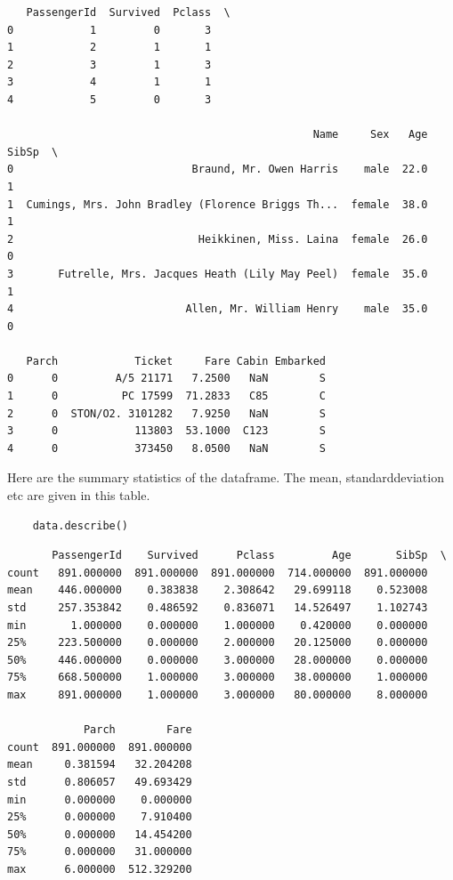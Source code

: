 \documentclass[11pt]{article}
\begin{document}
\begin{verbatim}
   PassengerId  Survived  Pclass  \
0            1         0       3   
1            2         1       1   
2            3         1       3   
3            4         1       1   
4            5         0       3   

                                                Name     Sex   Age  SibSp  \
0                            Braund, Mr. Owen Harris    male  22.0      1   
1  Cumings, Mrs. John Bradley (Florence Briggs Th...  female  38.0      1   
2                             Heikkinen, Miss. Laina  female  26.0      0   
3       Futrelle, Mrs. Jacques Heath (Lily May Peel)  female  35.0      1   
4                           Allen, Mr. William Henry    male  35.0      0   

   Parch            Ticket     Fare Cabin Embarked  
0      0         A/5 21171   7.2500   NaN        S  
1      0          PC 17599  71.2833   C85        C  
2      0  STON/O2. 3101282   7.9250   NaN        S  
3      0            113803  53.1000  C123        S  
4      0            373450   8.0500   NaN        S  
\end{verbatim}

Here are the summary statistics of the dataframe. The mean,
standarddeviation etc are given in this table.

\begin{verbatim}
    data.describe()
\end{verbatim}

\begin{verbatim}
       PassengerId    Survived      Pclass         Age       SibSp  \
count   891.000000  891.000000  891.000000  714.000000  891.000000   
mean    446.000000    0.383838    2.308642   29.699118    0.523008   
std     257.353842    0.486592    0.836071   14.526497    1.102743   
min       1.000000    0.000000    1.000000    0.420000    0.000000   
25%     223.500000    0.000000    2.000000   20.125000    0.000000   
50%     446.000000    0.000000    3.000000   28.000000    0.000000   
75%     668.500000    1.000000    3.000000   38.000000    1.000000   
max     891.000000    1.000000    3.000000   80.000000    8.000000   

            Parch        Fare  
count  891.000000  891.000000  
mean     0.381594   32.204208  
std      0.806057   49.693429  
min      0.000000    0.000000  
25%      0.000000    7.910400  
50%      0.000000   14.454200  
75%      0.000000   31.000000  
max      6.000000  512.329200  
\end{verbatim}
\end{document}
